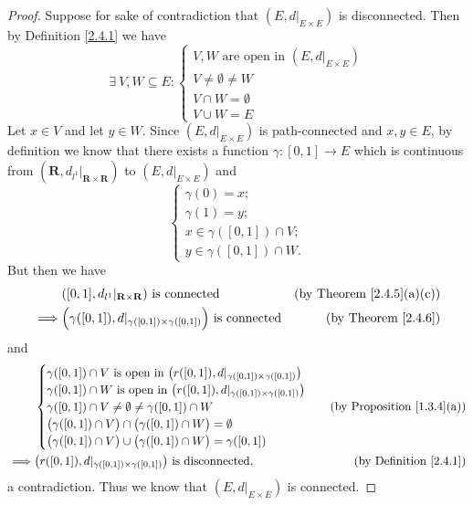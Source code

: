 \begin{proof}
    Suppose for sake of contradiction that \((E, d|_{E \times E})\) is disconnected.
    Then by Definition \ref{2.4.1} we have
    \[
        \exists\ V, W \subseteq E : \begin{cases}
            V, W \text{ are open in } (E, d|_{E \times E}) \\
            V \neq \emptyset \neq W                        \\
            V \cap W = \emptyset                           \\
            V \cup W = E
        \end{cases}
    \]
    Let \(x \in V\) and let \(y \in W\).
    Since \((E, d|_{E \times E})\) is path-connected and \(x, y \in E\), by definition we know that there exists a function \(\gamma : [0, 1] \to E\) which is continuous from \((\mathbf{R}, d_{l^1}|_{\mathbf{R} \times \mathbf{R}})\) to \((E, d|_{E \times E})\) and
    \[
        \begin{cases}
            \gamma(0) = x;               \\
            \gamma(1) = y;               \\
            x \in \gamma([0, 1]) \cap V; \\
            y \in \gamma([0, 1]) \cap W.
        \end{cases}
    \]
    But then we have
    \begin{align*}
                 & ([0, 1], d_{l^1}|_{\mathbf{R} \times \mathbf{R}}) \text{ is connected}                   & \text{(by Theorem \ref{2.4.5}(a)(c))} \\
        \implies & \Big(\gamma([0, 1]), d|_{\gamma([0, 1]) \times \gamma([0, 1])}\Big) \text{ is connected} & \text{(by Theorem \ref{2.4.6})}
    \end{align*}
    and
    \begin{align*}
                 & \begin{cases}
            \gamma([0, 1]) \cap V \text{ is open in } \big(r([0, 1]), d|_{\gamma([0, 1]) \times \gamma([0, 1])}\big) \\
            \gamma([0, 1]) \cap W \text{ is open in } \big(r([0, 1]), d|_{\gamma([0, 1]) \times \gamma([0, 1])}\big) \\
            \gamma([0, 1]) \cap V \neq \emptyset \neq \gamma([0, 1]) \cap W                                          \\
            \big(\gamma([0, 1]) \cap V\big) \cap \big(\gamma([0, 1]) \cap W\big) = \emptyset                         \\
            \big(\gamma([0, 1]) \cap V\big) \cup \big(\gamma([0, 1]) \cap W\big) = \gamma([0, 1])
        \end{cases}                                                              & \text{(by Proposition \ref{1.3.4}(a))} \\
        \implies & \big(r([0, 1]), d|_{\gamma([0, 1]) \times \gamma([0, 1])}\big) \text{ is disconnected}, & \text{(by Definition \ref{2.4.1})}
    \end{align*}
    a contradiction.
    Thus we know that \((E, d|_{E \times E})\) is connected.
\end{proof}


